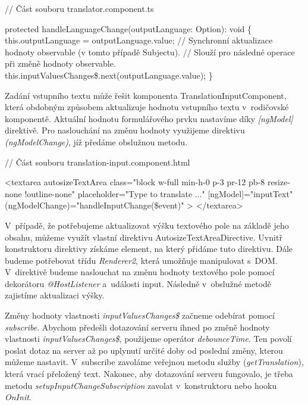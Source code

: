 \begin{prog}
// Část souboru translator.component.ts

protected handleLanguageChange(outputLanguage: Option): void \{
  this.outputLanguage = outputLanguage.value;
  // Synchronní aktualizace hodnoty observable (v tomto případě Subjectu).
  // Slouží pro následné operace při změně hodnoty observable.
  this.inputValuesChanges\$.next(outputLanguage.value);
\}
\end{prog}

Zadání vstupního textu může řešit komponenta TranslationInputComponent, která obdobným způsobem aktualizuje hodnotu vstupního textu v~rodičovské komponentě. 
Aktuální hodnotu formulářového prvku nastavíme díky \emph{[ngModel]} direktivě. 
Pro naslouchání na změnu hodnoty využijeme direktivu \emph{(ngModelChange)}, jíž předáme obslužnou metodu.

\begin{prog}
// Část souboru translation-input.component.html

<textarea
  autosizeTextArea
  class="block w-full min-h-0 p-3 pr-12 pb-8 resize-none !outline-none"
  placeholder="Type to translate ..."
  [ngModel]="inputText"
  (ngModelChange)="handleInputChange(\$event)"
>
</textarea>
\end{prog}

V~případě, že potřebujeme aktualizovat výšku textového pole na základě jeho obsahu, můžeme využít vlastní direktivu AutosizeTextAreaDirective. 
Uvnitř konstruktoru direktivy získáme element, na který přidáme tuto direktivu. Dále budeme potřebovat třídu \emph{Renderer2}, která umožňuje manipulovat s~DOM. 
V~direktivě budeme naslouchat na změnu hodnoty textového pole pomocí dekorátoru \emph{@HostListener} a~události input. Následně v~obslužné metodě zajistíme aktualizaci výšky.

Změny hodnoty vlastnosti \emph{inputValuesChanges\$} začneme odebírat pomocí \emph{subscribe}. 
Abychom předešli dotazování serveru ihned po změně hodnoty vlastnosti \emph{inputValuesChanges\$}, použijeme operátor \emph{debounceTime}. 
Ten povolí poslat dotaz na server až po uplynutí určité doby od poslední změny, kterou můžeme nastavit. 
V~subscribe zavoláme veřejnou metodu služby (\emph{getTranslation}), která vrací přeložený text. 
Nakonec, aby dotazování serveru fungovalo, je třeba metodu \emph{setupInputChangeSubscription} zavolat v~konstruktoru nebo hooku \emph{OnInit}.

